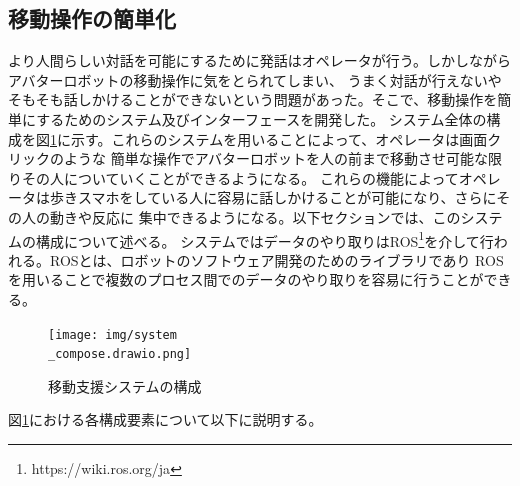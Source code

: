 \documentclass{kuisthesis}
\begin{document}
\subsection{移動操作の簡単化}
より人間らしい対話を可能にするために発話はオペレータが行う。しかしながらアバターロボットの移動操作に気をとられてしまい、
うまく対話が行えないやそもそも話しかけることができないという問題があった。そこで、移動操作を簡単にするためのシステム及びインターフェースを開発した。
システム全体の構成を図\ref{pic:systemcompose}に示す。これらのシステムを用いることによって、オペレータは画面クリックのような
簡単な操作でアバターロボットを人の前まで移動させ可能な限りその人についていくことができるようになる。
これらの機能によってオペレータは歩きスマホをしている人に容易に話しかけることが可能になり、さらにその人の動きや反応に
集中できるようになる。以下セクションでは、このシステムの構成について述べる。
システムではデータのやり取りはROS\footnote{https://wiki.ros.org/ja}を介して行われる。ROSとは、ロボットのソフトウェア開発のためのライブラリであり
ROSを用いることで複数のプロセス間でのデータのやり取りを容易に行うことができる。
\begin{figure}[h]
  
  \texttt{[image: img/system\\\_compose.drawio.png]}
  \caption{移動支援システムの構成}
  \label{pic:systemcompose}

\end{figure}
図\ref{pic:systemcompose}における各構成要素について以下に説明する。
\end{document}
